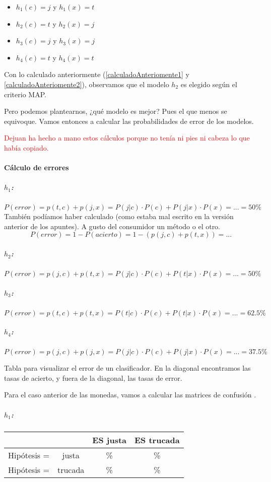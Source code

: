\documentclass{apuntes}
\begin{document}
\begin{example}
\begin{itemize}
	\item $h_1(c) = j$ y $h_1(x) = t$ 
	\item $h_2(c) = t$ y $h_2(x) = j$ 
	\item $h_3(c) = j$ y $h_3(x) = j$ 
	\item $h_4(c) = t$ y $h_4(x) = t$ 
\end{itemize}

Con lo calculado anteriormente (\ref{calculadoAnteriomente1} y \ref{calculadoAnteriomente2}), observamos que el modelo $h_2$ es elegido según el criterio MAP. 

Pero podemos plantearnos, ¿qué modelo es mejor? Pues el que menos se equivoque. Vamos entonces a calcular las probabilidades de error de los modelos.

\textcolor{red}{Dejuan ha hecho a mano estos cálculos porque no tenía ni pies ni cabeza lo que había copiado.}

\paragraph{Cálculo de errores}
\subparagraph{$h_1$:} $P(error) = p(t,c) + p(j,x) = P(j|c)·P(c) + P(j|x)·P(x) = ... = 50\% $
También podíamos haber calculado (como estaba mal escrito en la versión anterior de los apuntes). A gusto del consumidor un método o el otro.
\[P(error) = 1-P(acierto) = 1 - (p(j,c) + p(t,x)) = ...\]

\subparagraph{$h_2$:} 
$P(error) = p(j,c) + p(t,x) = P(j|c)·P(c) + P(t|x)·P(x) = ... = 50\%$
\subparagraph{$h_3$:} 
$P(error) = p(t,c) + p(t,x) = P(t|c)·P(c) + P(t|x)·P(x) = ... = 62.5\%$
\subparagraph{$h_4$:} 
$P(error) = p(j,c) + p(j,x) = P(j|c)·P(c) + P(j|x)·P(x) = ... = 37.5\%$
\end{example}


 \begin{defn}
 	Tabla para visualizar el error de un clasificador. En la diagonal encontramos las tasas de acierto, y fuera de la diagonal, las tasas de error.
 \end{defn}


Para el caso anterior de las monedas, vamos a calcular las matrices de confusión  \textcolor{según dejuan (que no lo tiene nada claro y mañana lo completa)}.



\subparagraph{$h_1$:}
\begin{center}
\begin{tabular}{cc|cc}
 && ES justa & ES trucada \\\hline
 Hipótesis =& justa & \% & \%\\
 Hipótesis =& trucada & \% & \%
\end{tabular}
\end{center}
\end{document}
